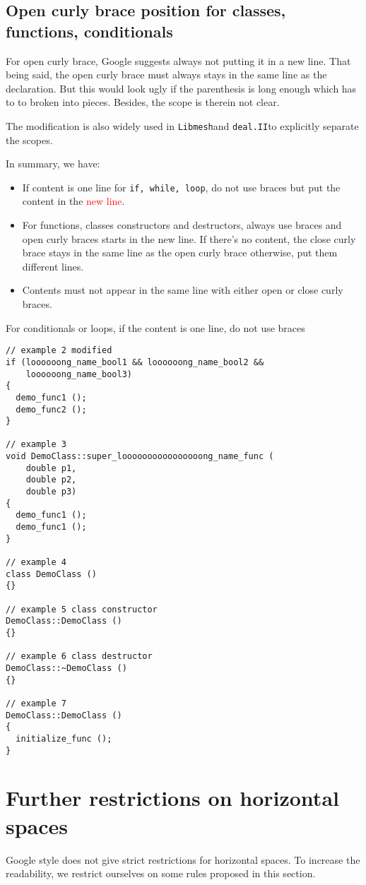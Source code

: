 \documentclass[openany]{book}
\newcommand{\libmesh}{{\tt Libmesh}}
\newcommand{\dealii}{{\tt deal.II}}
\newcommand{\red}[1]{\textcolor{red}{#1}}
\begin{document}
\subsection{Open curly brace position for classes, functions, conditionals}
For open curly brace, Google suggests always not putting it in a new line. That being said, the open curly brace must always stays in the same line as the declaration. But this would look ugly if the parenthesis is long enough which has to to broken into pieces. Besides, the scope is therein not clear.

The modification is also widely used in \libmesh and \dealii to explicitly separate the scopes.

In summary, we have:
\begin{itemize}
	\item If content is one line for {\tt if, while, loop}, do not use braces but put the content in the \red{new line}.
	\item For functions, classes constructors and destructors, always use braces and open curly braces starts in the new line. If there's no content, the close curly brace stays in the same line as the open curly brace otherwise, put them different lines.
	\item Contents must not appear in the same line with either open or close curly braces.
\end{itemize}

For conditionals or loops, if the content is one line, do not use braces
\begin{lstlisting}
// example 2 modified
if (loooooong_name_bool1 && loooooong_name_bool2 &&
    loooooong_name_bool3) 
{
  demo_func1 ();
  demo_func2 ();
}

// example 3
void DemoClass::super_loooooooooooooooong_name_func (
    double p1,
    double p2,
    double p3) 
{
  demo_func1 ();
  demo_func1 ();
}

// example 4
class DemoClass ()
{}

// example 5 class constructor
DemoClass::DemoClass ()
{}

// example 6 class destructor
DemoClass::~DemoClass ()
{}

// example 7
DemoClass::DemoClass ()
{
  initialize_func ();
}
\end{lstlisting}

\section{Further restrictions on horizontal spaces}
Google style does not give strict restrictions for horizontal spaces. To increase the readability, we restrict ourselves on some rules proposed in this section.
\end{document}
